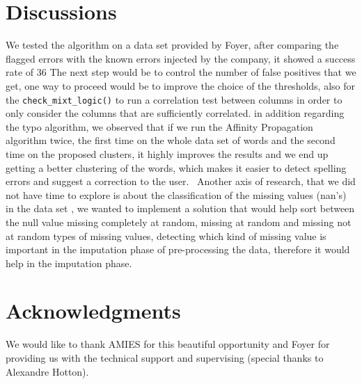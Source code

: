 \documentclass{article}
\begin{document}

\section{Discussions} %
\label{sec:Discussions}
We tested the algorithm on a data set provided by Foyer, after comparing the flagged errors with the known errors injected by the company, it showed a success rate of 36%
The next step would be to control the number of false positives that we get, one way to proceed would be to improve the choice of the thresholds, also for the \texttt{check\_mixt\_logic()} to run a correlation test between columns in order to only consider the columns that are sufficiently correlated.
in addition regarding the typo algorithm, we observed that if we run the Affinity Propagation algorithm twice, the first time on the whole data set of words and the second time on the proposed clusters, it highly improves the results and we end up getting a better clustering of the words, which makes it easier to detect spelling errors and suggest a correction to the user. \
Another axis of research, that we did not have time to explore is about the classification of the missing values (nan's) in the data set , we wanted to implement a solution that would help sort between the null value  missing completely at random, missing at random and missing not at random types of missing values, detecting which kind of missing value is important in the imputation phase of pre-processing the data, therefore it would help in the imputation phase.

\section*{Acknowledgments} %
\label{sec:Acknowledgments}
We would like to thank AMIES for this beautiful opportunity and Foyer for providing us with the technical support and supervising (special thanks to Alexandre Hotton).


\end{document}
